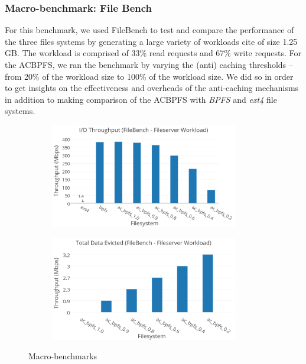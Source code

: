 \subsubsection{Macro-benchmark: File Bench}
For this benchmark, we used FileBench to test and compare the performance of the three files systems by generating a large variety of workloads {cite} of size 1.25 GB. The workload is comprised of 33\% read requests and 67\% write requests. For the AC\-BPFS, we ran the benchmark by varying the (anti) caching thresholds – from 20\% of the workload size to 100\% of the workload size. We did so in order to get insights on the effectiveness and overheads of the anti-caching mechanisms in addition to making comparison of the AC\-BPFS with \textit{BPFS} and  \textit{ext4}  file systems.

\begin{figure}[t]\centering
\begin{subfigure}{.49\textwidth}
\centering
\includegraphics[width=0.9\textwidth]{figs/filebench.png}
\end{subfigure}
\begin{subfigure}{.49\textwidth}
\centering
\includegraphics[width=0.9\textwidth]{figs/bench2.png}
\end{subfigure}
\caption{Macro-benchmarks}
\label{fig1:fig1}
\end{figure}


